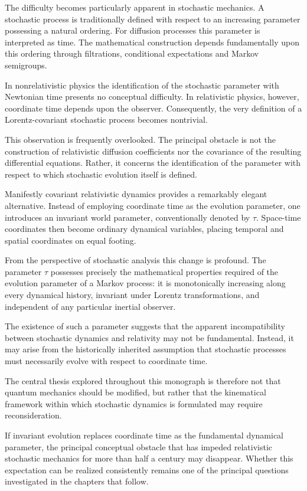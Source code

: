 The difficulty becomes particularly apparent in stochastic mechanics. A
stochastic process is traditionally defined with respect to an increasing
parameter possessing a natural ordering. For diffusion processes this parameter
is interpreted as time. The mathematical construction depends fundamentally
upon this ordering through filtrations, conditional expectations and Markov
semigroups.

In nonrelativistic physics the identification of the stochastic parameter with
Newtonian time presents no conceptual difficulty. In relativistic physics,
however, coordinate time depends upon the observer. Consequently, the very
definition of a Lorentz-covariant stochastic process becomes nontrivial.

This observation is frequently overlooked. The principal obstacle is not the
construction of relativistic diffusion coefficients nor the covariance of the
resulting differential equations. Rather, it concerns the identification of
the parameter with respect to which stochastic evolution itself is defined.

Manifestly covariant relativistic dynamics provides a remarkably elegant
alternative. Instead of employing coordinate time as the evolution parameter,
one introduces an invariant world parameter, conventionally denoted by
$\tau$. Space-time coordinates then become ordinary dynamical variables,
placing temporal and spatial coordinates on equal footing.

From the perspective of stochastic analysis this change is profound. The
parameter $\tau$ possesses precisely the mathematical properties required of
the evolution parameter of a Markov process: it is monotonically increasing
along every dynamical history, invariant under Lorentz transformations, and
independent of any particular inertial observer.

The existence of such a parameter suggests that the apparent incompatibility
between stochastic dynamics and relativity may not be fundamental. Instead,
it may arise from the historically inherited assumption that stochastic
processes must necessarily evolve with respect to coordinate time.

The central thesis explored throughout this monograph is therefore not that
quantum mechanics should be modified, but rather that the kinematical
framework within which stochastic dynamics is formulated may require
reconsideration.

If invariant evolution replaces coordinate time as the fundamental dynamical
parameter, the principal conceptual obstacle that has impeded relativistic
stochastic mechanics for more than half a century may disappear. Whether this
expectation can be realized consistently remains one of the principal
questions investigated in the chapters that follow.


